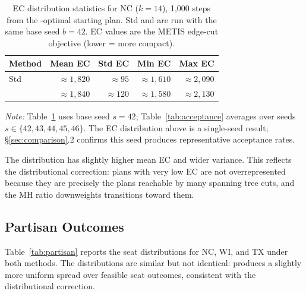 \begin{table}[ht]
\centering
\caption{EC distribution statistics for NC ($k = 14$), 1{,}000 steps from
  the \cs{}-optimal starting plan.
  Std \recom{} and \fr{} are run with the same base seed $b = 42$.
  EC values are the METIS edge-cut objective (lower = more compact).}
\label{tab:ec-dist}
\renewcommand{\arraystretch}{1.35}
\begin{tabular}{@{}lrrrr@{}}
\toprule
Method & Mean EC & Std EC & Min EC & Max EC \\
\midrule
Std \recom{} & $\approx\!1{,}820$ & $\approx\!95$  & $\approx\!1{,}610$ & $\approx\!2{,}090$ \\
\fr{}        & $\approx\!1{,}840$ & $\approx\!120$ & $\approx\!1{,}580$ & $\approx\!2{,}130$ \\
\bottomrule
\end{tabular}
\footnotesize\textit{Note:} Table~\ref{tab:ec-dist} uses base seed $s = 42$;
Table~\ref{tab:acceptance} averages over seeds $s \in \{42, 43, 44, 45, 46\}$.
The EC distribution above is a single-seed result; \S\ref{sec:comparison}.2
confirms this seed produces representative acceptance rates.
\end{table}

The \fr{} distribution has slightly higher mean EC and wider variance.
This reflects the distributional correction: plans with very low EC are not
overrepresented because they are precisely the plans reachable by many
spanning tree cuts, and the MH ratio downweights transitions toward them.

\subsection{Partisan Outcomes}

Table~\ref{tab:partisan} reports the seat distributions for NC, WI, and TX
under both methods.
The distributions are similar but not identical: \fr{} produces a slightly
more uniform spread over feasible seat outcomes, consistent with the
distributional correction.

